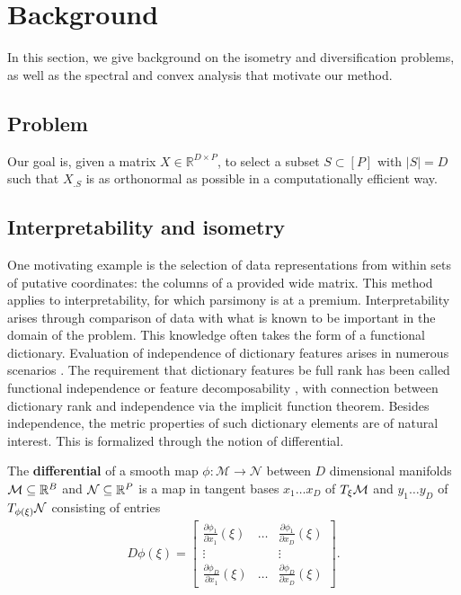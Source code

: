 \section{Background}

In this section, we give background on the isometry and diversification problems, as well as the spectral and convex analysis that motivate our method.

\subsection{Problem}

Our goal is, given a matrix $ X \in \mathbb R^{D \times P}$, to select a subset $ S \subset [P]$ with $| S| = D$ such that $X_{.  S}$ is as orthonormal as possible in a computationally efficient way.

\subsection{Interpretability and isometry}

One motivating example is the selection of data representations from within sets of putative coordinates: the columns of a provided wide matrix.
This method applies to interpretability, for which parsimony is at a premium.
Interpretability arises through comparison of data with what is known to be important in the domain of the problem.
This knowledge often takes the form of a functional dictionary.
Evaluation of independence of dictionary features arises in numerous scenarios \citep{Chen2019-km, Koelle2022-ju, He2023-ch}.
The requirement that dictionary features be full rank has been called functional independence \citep{Koelle2022-ju} or feature decomposability \citep{templeton2024scaling}, with connection between dictionary rank and independence via the implicit function theorem.
Besides independence, the metric properties of such dictionary elements are of natural interest.
This is formalized through the notion of differential.

\begin{definition}
The \textbf{differential} of a smooth map $\phi:\mathcal M \to \mathcal N$ between $D$ dimensional manifolds $\mathcal{M} \subseteq \mathbb R^B$ and $\mathcal{N} \subseteq \mathbb R^P$ is a map in tangent bases $x_1 \dots x_{D}$ of $T_\xi \mathcal{M}$ and $y_1 \dots y_{D}$ of $T_{\phi(\xi)} \mathcal{N}$ consisting of entries
\begin{align}
\label{eq:diff}
    D\phi (\xi) = \begin{bmatrix}
    \frac{\partial \phi_1  }{\partial x_1}(\xi)  & \dots & \frac{\partial \phi_1 }{\partial x_D}(\xi)  \\
    \vdots & & \vdots \\
    \frac{\partial \phi_D }{\partial x_1}(\xi)  & \dots & \frac{\partial \phi_{D}  }{\partial x_{D}}(\xi) 
    \end{bmatrix}.
\end{align}
\end{definition}

